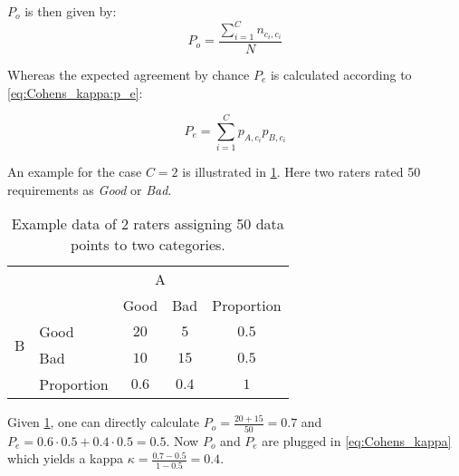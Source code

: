$P_o$ is then given by:
\nopagebreak
\begin{equation}\label{eq:Cohens_kappa:p_o}
    P_o = \frac{\sum_{i=1}^{C} n_{c_i, c_i}}{N}
\end{equation}

Whereas the expected agreement by chance $P_e$ is calculated according to \cref{eq:Cohens_kappa:p_e}:

\begin{equation}\label{eq:Cohens_kappa:p_e}
    P_e = \sum_{i=1}^{C} p_{A, c_i} p_{B, c_i}
\end{equation}

An example for the case $C=2$ is illustrated in \cref{tab:cohens_kappa_sample_data}.
Here two raters rated 50 requirements as \textit{Good} or \textit{Bad}.

\begin{table}[htpb]
    \centering
    \begin{tabular}{l|l|c|c|c}
        \multicolumn{2}{c}{}&\multicolumn{2}{c}{A}&\\
        \cline{3-4}
        \multicolumn{2}{c|}{}&Good&Bad&\multicolumn{1}{c}{Proportion}\\
        \cline{2-4}
        \multirow{2}{*}{B}& Good & $20$ & $5$ & $0.5$\\
        \cline{2-4}
        & Bad & $10$ & $15$ & $0.5$\\
        \cline{2-4}
        \multicolumn{1}{c}{} & \multicolumn{1}{c}{Proportion} & \multicolumn{1}{c}{$0.6$} & \multicolumn{    1}{c}{$0.4$} & \multicolumn{1}{c}{$1$}\\
    \end{tabular}
    \caption[Cohen's Kappa sample data]{Example data of 2 raters assigning 50 data points to two categories.}\label{tab:cohens_kappa_sample_data}
\end{table}

Given \cref{tab:cohens_kappa_sample_data}, one can directly calculate $P_o = \frac{ 20 + 15 }{50} = 0.7$ and $P_e = 0.6 \cdot 0.5 + 0.4 \cdot 0.5 = 0.5$.
Now $P_o$ and $P_e$ are plugged in \cref{eq:Cohens_kappa} which yields a kappa $\kappa = \frac{0.7 - 0.5}{1 - 0.5} = 0.4$.
